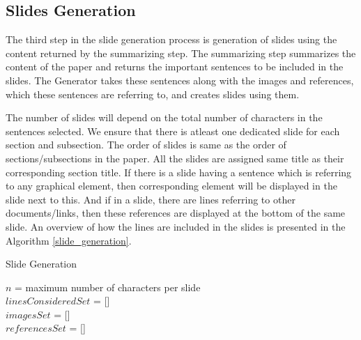 \subsection{Slides Generation}

The third step in the slide generation process is generation of slides using 
the content returned by the summarizing step. The summarizing step summarizes 
the content of the paper and returns the important sentences to be included in the slides.
The Generator takes these sentences along with the images and references, which these
sentences are referring to, and creates slides using them.

The number of slides will depend on the total number of characters in the sentences selected.
We ensure that there is atleast one dedicated slide for each section and subsection.
The order of slides is same as the order of sections/subsections in the paper.
All the slides are assigned same title as their corresponding section title.
If there is a slide having a sentence which is referring to any graphical element, then
corresponding element will be displayed in the slide next to this. And if in a slide,
there are lines referring to other documents/links, then these references are displayed
at the bottom of the same slide. An overview of how the lines are included in the
slides is presented in the Algorithm \ref{slide_generation}.

\begin{algorithm}[H]\label{slide_generation}
 \SetLine %
 \caption{Slide Generation}
 $n$ = maximum number of characters per slide\\
 $linesConsideredSet$ = []\\
 $imagesSet$ = []\\
 $referencesSet$ = []\\
\end{algorithm}
